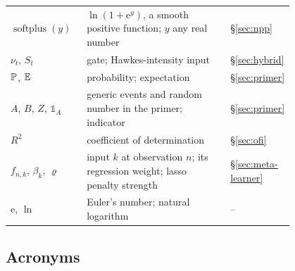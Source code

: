 \begin{center}
\begin{longtable}{>{\raggedright\arraybackslash}p{0.27\linewidth}>{\raggedright\arraybackslash}p{0.53\linewidth}l}
$\operatorname{softplus}(y)$ & $\ln(1+\mathrm{e}^{y})$, a smooth positive function; $y$ any real number & \S\ref{sec:npp} \\
$\nu_t$, $S_t$ & gate; Hawkes-intensity input & \S\ref{sec:hybrid} \\
$\P$, $\E$ & probability; expectation & \S\ref{sec:primer} \\
$A$, $B$, $Z$, $\mathbb{1}_A$ & generic events and random number in the primer; indicator & \S\ref{sec:primer} \\
$R^2$ & coefficient of determination & \S\ref{sec:ofi} \\
$f_{n,k}$, $\beta_k$, $\varrho$ & input $k$ at observation $n$; its regression weight; lasso penalty strength & \S\ref{sec:meta-learner} \\
$\mathrm{e}$, $\ln$ & Euler's number; natural logarithm & -- \\
\bottomrule
\end{longtable}
\end{center}

\subsection{Acronyms}

